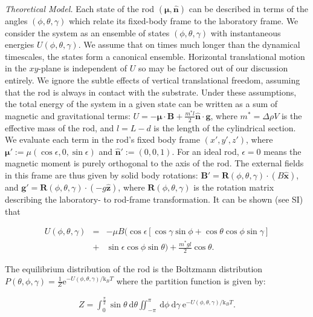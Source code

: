 \documentclass[aps,prl,twocolumn,superscriptaddress]{revtex4-1}
\newcommand{\vcrm}[1]{\mathbf{#1}}
\newcommand{\hvcrm}[1]{\mathbf{\hat{#1}}}
\newcommand{\vc}[1]{\boldsymbol{#1}}
\newcommand{\ssc}[0]{\sin{\gamma}}
\newcommand{\ccc}[0]{\cos{\gamma}}
\newcommand{\sst}[0]{\sin{\theta}}
\newcommand{\cct}[0]{\cos{\theta}}
\newcommand{\ssp}[0]{\sin{\phi}}
\newcommand{\ccp}[0]{\cos{\phi}}
\newcommand{\dd}{\mathrm{d}}
\newcommand{\ee}{\mathrm{e}}
\newcommand{\kk}{\mathrm{k}_B}
\newcommand{\vm}{\vc{\mu}}
\newcommand{\vn}{\hvcrm{n}}
\newcommand{\vB}{\vcrm{B}}
\begin{document}
%
%
%
%
%
%
%
\emph{Theoretical Model.} Each state of the rod $(\vm,\vn)$ can be described in terms of the angles $(\phi, \theta, \gamma)$ which relate its fixed-body frame to the laboratory frame. We consider the system as an ensemble of states $(\phi,\theta,\gamma)$ with instantaneous energies $U(\phi,\theta,\gamma)$. We assume that on times much longer than the dynamical timescales, the states form a canonical ensemble. Horizontal translational motion in the $xy$-plane is independent of $U$ so may be factored out of our discussion entirely. We ignore the subtle effects of vertical translational freedom, assuming that the rod is always in contact with the substrate. Under these assumptions, the total energy of the system in a given state can be written as a sum of magnetic and gravitational terms: $U = -\vm \cdot\vB + \frac{m^*l}{2} \vn \cdot \vcrm{g}$, where $m^*=\Delta\rho V$ is the effective mass of the rod, and $l=L-d$ is the length of the cylindrical section. We evaluate each term in the rod's fixed body frame $(x',y',z')$, where $\vc{\mu}' :=\mu(\cos\epsilon,0,\sin\epsilon)$ and $\hvcrm{n}' :=(0,0,1)$. For an ideal rod, $\epsilon=0$ means the magnetic moment is purely orthogonal to the axis of the rod. The external fields in this frame are thus given by solid body rotations: $\vcrm{B}' = \vcrm{R}(\phi,\theta,\gamma)\cdot ( B \hvcrm{x})$, and $\vcrm{g}'= \vcrm{R}(\phi,\theta,\gamma)\cdot ( -g \hvcrm{z})$, where $\vcrm{R}(\phi,\theta,\gamma)$ is the rotation matrix describing the laboratory- to rod-frame transformation. It can be shown (see SI) that

\begin{eqnarray}
U(\phi,\theta,\gamma) & = & -\mu B \Big( \cos\epsilon [\ccc\ssp + \cct\ccp\ssc] \nonumber \\
& + & \sin\epsilon \cos\phi\sin\theta \Big) + \frac{m^*gl}{2} \cct.
\end{eqnarray}

The equilibrium distribution of the rod is the Boltzmann distribution $P(\theta, \phi, \gamma)  =  \frac{1}{Z} \ee^{ -U(\phi, \theta, \gamma)/\kk T }$ where the partition function is given by:

\begin{eqnarray}
Z  =  \int_0^{\frac{\pi}{2}} \sst\ \dd\theta \iint_{-\pi}^{\pi}\ \dd\phi\ \dd\gamma \ \ee^{ -U(\phi, \theta, \gamma)/\kk T }.
\end{eqnarray}
\end{document}
